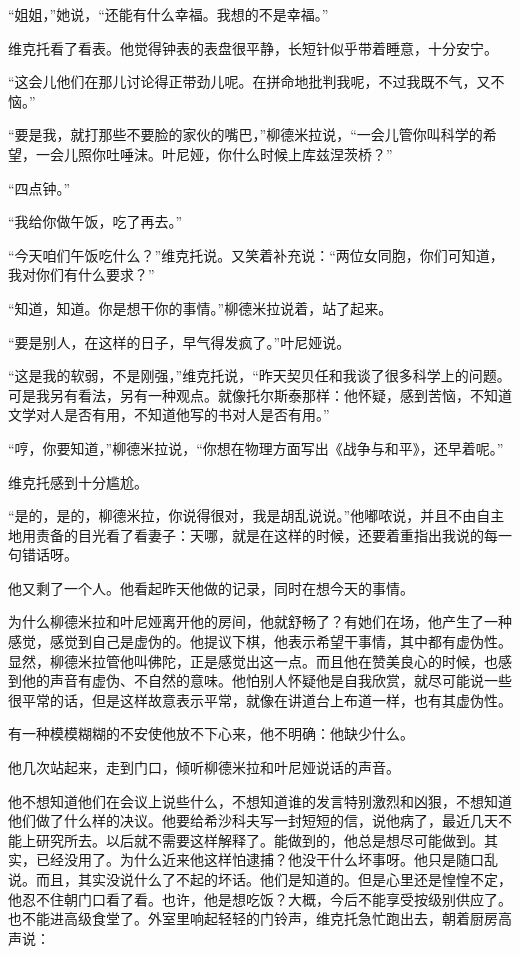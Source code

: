 “姐姐，”她说，“还能有什么幸福。我想的不是幸福。”

维克托看了看表。他觉得钟表的表盘很平静，长短针似乎带着睡意，十分安宁。

“这会儿他们在那儿讨论得正带劲儿呢。在拼命地批判我呢，不过我既不气，又不恼。”

“要是我，就打那些不要脸的家伙的嘴巴，”柳德米拉说，“一会儿管你叫科学的希望，一会儿照你吐唾沫。叶尼娅，你什么时候上库兹涅茨桥？”

“四点钟。”

“我给你做午饭，吃了再去。”

“今天咱们午饭吃什么？”维克托说。又笑着补充说：“两位女同胞，你们可知道，我对你们有什么要求？”

“知道，知道。你是想干你的事情。”柳德米拉说着，站了起来。

“要是别人，在这样的日子，早气得发疯了。”叶尼娅说。

“这是我的软弱，不是刚强，”维克托说，“昨天契贝任和我谈了很多科学上的问题。可是我另有看法，另有一种观点。就像托尔斯泰那样：他怀疑，感到苦恼，不知道文学对人是否有用，不知道他写的书对人是否有用。”

“哼，你要知道，”柳德米拉说，“你想在物理方面写出《战争与和平》，还早着呢。”

维克托感到十分尴尬。

“是的，是的，柳德米拉，你说得很对，我是胡乱说说。”他嘟哝说，并且不由自主地用责备的目光看了看妻子：天哪，就是在这样的时候，还要着重指出我说的每一句错话呀。

他又剩了一个人。他看起昨天他做的记录，同时在想今天的事情。

为什么柳德米拉和叶尼娅离开他的房间，他就舒畅了？有她们在场，他产生了一种感觉，感觉到自己是虚伪的。他提议下棋，他表示希望干事情，其中都有虚伪性。显然，柳德米拉管他叫佛陀，正是感觉出这一点。而且他在赞美良心的时候，也感到他的声音有虚伪、不自然的意味。他怕别人怀疑他是自我欣赏，就尽可能说一些很平常的话，但是这样故意表示平常，就像在讲道台上布道一样，也有其虚伪性。

有一种模模糊糊的不安使他放不下心来，他不明确：他缺少什么。

他几次站起来，走到门口，倾听柳德米拉和叶尼娅说话的声音。

他不想知道他们在会议上说些什么，不想知道谁的发言特别激烈和凶狠，不想知道他们做了什么样的决议。他要给希沙科夫写一封短短的信，说他病了，最近几天不能上研究所去。以后就不需要这样解释了。能做到的，他总是想尽可能做到。其实，已经没用了。为什么近来他这样怕逮捕？他没干什么坏事呀。他只是随口乱说。而且，其实没说什么了不起的坏话。他们是知道的。但是心里还是惶惶不定，他忍不住朝门口看了看。也许，他是想吃饭？大概，今后不能享受按级别供应了。也不能进高级食堂了。外室里响起轻轻的门铃声，维克托急忙跑出去，朝着厨房高声说：

